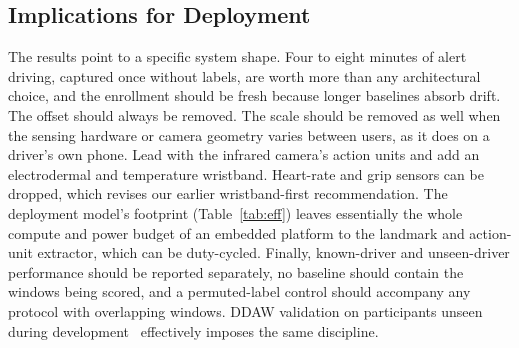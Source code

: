 \documentclass[journal]{IEEEtran}
\begin{document}
\subsection{Implications for Deployment}
The results point to a specific system shape. Four to eight minutes of alert
driving, captured once without labels, are worth more than any architectural
choice, and the enrollment should be fresh because longer baselines absorb
drift. The offset should always be removed. The scale should be removed as
well when the sensing hardware or camera geometry varies between users, as it
does on a driver's own phone. Lead with the infrared camera's action units and
add an electrodermal and temperature wristband. Heart-rate and grip sensors
can be dropped, which revises our earlier wristband-first recommendation. The
deployment model's footprint (Table~\ref{tab:eff}) leaves essentially the
whole compute and power budget of an embedded platform to the landmark and
action-unit extractor, which can be duty-cycled. Finally, known-driver and
unseen-driver performance should be reported separately, no baseline should
contain the windows being scored, and a permuted-label control should
accompany any protocol with overlapping windows. DDAW validation on
participants unseen during development~\cite{eu2021ddaw} effectively imposes
the same discipline.

\end{document}
